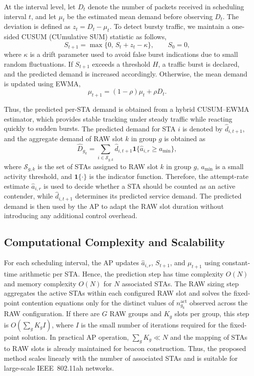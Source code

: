 \documentclass[journal]{IEEEtran}
\newcommand{\rev}[1]{{\color{blue}#1}}
\begin{document}
At the interval level, let $D_t$ denote the number of packets received in scheduling interval $t$, and let $\mu_t$ be the estimated mean demand before observing $D_t$. The deviation is defined as $z_t = D_t - \mu_t$. To detect bursty traffic, we maintain a one-sided CUSUM (CUmulative SUM) statistic \rev{\cite{Page1954CUSUM}} as follows,
\begin{equation}
S_{t+1} = \max\{0,\, S_t + z_t - \kappa\}, \qquad S_0 = 0,
\label{eq:cusum_update}
\end{equation}
where $\kappa$ is a drift parameter used to avoid false burst indications due to small random fluctuations. If $S_{t+1}$ exceeds a threshold $H$, a traffic burst is declared, and the predicted demand is increased accordingly. Otherwise, the mean demand is updated using EWMA,
\begin{equation} \label{eq1}
    \mu_{t+1} = (1-\rho)\mu_t + \rho D_t.
\end{equation}


Thus, the predicted per-STA demand is obtained from a hybrid CUSUM--EWMA estimator, which provides stable tracking under steady traffic while reacting quickly to sudden bursts. \rev{The predicted demand for STA $i$ is denoted by $\hat{d}_{i,t+1}$, and the aggregate demand of RAW slot $k$ in group $g$ is obtained as}
\begingroup\color{blue}
\begin{equation}
\hat{D}_{g_k}=\sum_{i\in\mathcal{S}_{g,k}} \hat{d}_{i,t+1}\mathbf{1}\{\hat{a}_{i,r}\ge a_{\min}\},
\label{eq:predicted_slot_demand}
\end{equation}
\endgroup
\rev{where $\mathcal{S}_{g,k}$ is the set of STAs assigned to RAW slot $k$ in group $g$, $a_{\min}$ is a small activity threshold, and $\mathbf{1}\{\cdot\}$ is the indicator function. Therefore, the attempt-rate estimate $\hat{a}_{i,r}$ is used to decide whether a STA should be counted as an active contender, while $\hat{d}_{i,t+1}$ determines its predicted service demand.} The predicted demand is then used by the AP to adapt the RAW slot duration without introducing any additional control overhead.

\begingroup\color{blue}
\subsection{Computational Complexity and Scalability}
For each scheduling interval, the AP updates $\hat{a}_{i,r}$, $S_{t+1}$, and $\mu_{t+1}$ using constant-time arithmetic per STA. Hence, the prediction step has time complexity $O(N)$ and memory complexity $O(N)$ for $N$ associated STAs. The RAW sizing step aggregates the active STAs within each configured RAW slot and solves the fixed-point contention equations only for the distinct values of $n_{g_k}^{\mathrm{act}}$ observed across the RAW configuration. If there are $G$ RAW groups and $K_g$ slots per group, this step is $O(\sum_g K_g I)$, where $I$ is the small number of iterations required for the fixed-point solution. In practical AP operation, $\sum_g K_g \ll N$ and the mapping of STAs to RAW slots is already maintained for beacon construction. Thus, the proposed method scales linearly with the number of associated STAs and is suitable for large-scale IEEE~802.11ah networks.
\endgroup
\end{document}
